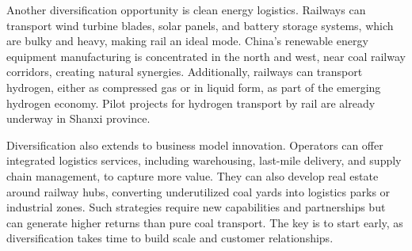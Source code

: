 \documentclass[10pt,a4paper]{article}
\begin{document}
{\small Another diversification opportunity is clean energy logistics. Railways can transport wind turbine blades, solar panels, and battery storage systems, which are bulky and heavy, making rail an ideal mode. China's renewable energy equipment manufacturing is concentrated in the north and west, near coal railway corridors, creating natural synergies. Additionally, railways can transport hydrogen, either as compressed gas or in liquid form, as part of the emerging hydrogen economy. Pilot projects for hydrogen transport by rail are already underway in Shanxi province.}

{\small Diversification also extends to business model innovation. Operators can offer integrated logistics services, including warehousing, last-mile delivery, and supply chain management, to capture more value. They can also develop real estate around railway hubs, converting underutilized coal yards into logistics parks or industrial zones. Such strategies require new capabilities and partnerships but can generate higher returns than pure coal transport. The key is to start early, as diversification takes time to build scale and customer relationships.}
\vspace{3pt}\noindent{}\vspace{4pt}

\vspace{4pt}{\textcolor{BOBlue}{\scriptsize\bfseries INDICATIVE DEVELOPMENT ROADMAP}}\par
\begin{center}\end{center}
\end{document}
